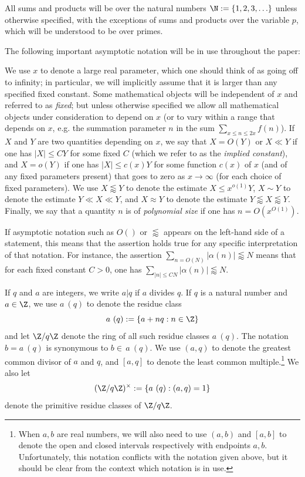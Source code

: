 All sums and products will be over the natural numbers $\N := \{1,2,3,\ldots\}$ unless otherwise specified, with the exceptions of sums and products over the variable $p$, which will be understood to be over primes.

The following important asymptotic notation will be in use throughout the paper:

\begin{definition}\label{asym}  We use $x$ to denote a large real parameter, which one should think of as going off to infinity; in particular, we will implicitly assume that it is larger than any specified fixed constant. Some mathematical objects will be independent of $x$ and referred to as \emph{fixed}; but unless otherwise specified we allow all mathematical objects under consideration to depend on $x$ (or to vary within a range that depends on $x$, e.g. the summation parameter $n$ in the sum $\sum_{x \leq n \leq 2x} f(n)$).  If $X$ and $Y$ are two quantities depending on $x$, we say that $X = O(Y)$ or $X \ll Y$ if one has $|X| \leq CY$ for some fixed $C$ (which we refer to as the \emph{implied constant}), and $X = o(Y)$ if one has $|X| \leq c(x) Y$ for some function $c(x)$ of $x$ (and of any fixed parameters present) that goes to zero as $x \to \infty$ (for each choice of fixed parameters).  We use $X \lessapprox Y$ to denote the estimate $X \leq x^{o(1)} Y$, $X \sim Y$ to denote the estimate $Y \ll X \ll Y$, and $X \approx Y$ to denote the estimate $Y \lessapprox X \lessapprox Y$.  Finally, we say that a quantity $n$ is of \emph{polynomial size} if one has $n = O(x^{O(1)})$.

If asymptotic notation such as $O()$ or $\lessapprox$ appears on the left-hand side of a statement, this means that the assertion holds true for any specific interpretation of that notation.  For instance, the assertion $\sum_{n=O(N)} |\alpha(n)| \lessapprox N$ means that for each fixed constant $C>0$, one has $\sum_{|n| \leq CN} |\alpha(n)|\lessapprox N$.
\end{definition}

If $q$ and $a$ are integers, we write $a|q$ if $a$ divides $q$.
If $q$ is a natural number and $a \in \Z$, we use $a\ (q)$ to denote
the residue class
$$ a\ (q) := \{ a+nq: n \in \Z \}$$
and let $\Z/q\Z$ denote the ring of all such residue classes $a\
(q)$. The notation $b=a\ (q)$ is synonymous to $b \in \, a \ (q)$. We
use $(a,q)$ to denote the greatest common divisor of $a$ and $q$, and
$[a,q]$ to denote the least common
multiple.\footnote{When $a,b$ are real numbers, we will also
  need to use $(a,b)$ and $[a,b]$ to denote the open and closed
  intervals respectively with endpoints $a,b$.  Unfortunately, this
  notation conflicts with the notation given above, but it should be
  clear from the context which notation is in use.}
We also let
$$ (\Z/q\Z)^\times := \{ a\ (q): (a,q)=1 \}$$
denote the primitive residue classes of $\Z/q\Z$.  

